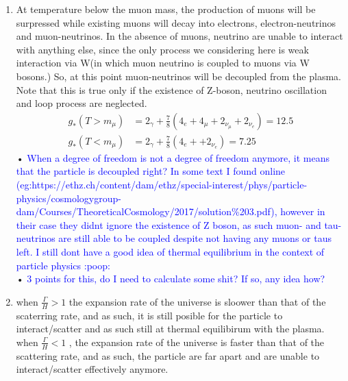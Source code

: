 \begin{enumerate}[label=\alph*)]
\item At temperature below the muon mass, the production of muons will be surpressed while existing muons will decay into electrons, electron-neutrinos and muon-neutrinos. In the absence of muons, neutrino are unable to interact with anything else, since the only process we considering here is weak interaction via W(in which muon neutrino is coupled to muons via W bosons.) So, at this point  muon-neutrinos will be decoupled from the plasma. Note that this is true only if the existence of Z-boson, neutrino oscillation and loop process are neglected.
\begin{align}
g_{\ast} (T>m_{\mu}) &= 2_{\gamma} + \frac{7}{8} (4_e + 4_{\mu} +  2_{\nu_{\mu}} + 2_{\nu_{e}}) =  12.5 \\
g_{\ast} (T<m_{\mu}) &= 2_{\gamma} + \frac{7}{8} (4_e +  + 2_{\nu_{e}}) =  7.25 
\end{align}•
\textcolor{blue}{When a degree of freedom is not a degree of freedom anymore, it means that the particle is decoupled right? In some text I found online (eg:https://ethz.ch/content/dam/ethz/special-interest/phys/particle-physics/cosmologygroup-dam/Courses/TheoreticalCosmology/2017/solution\%203.pdf), however in their case they didnt ignore the existence of Z boson, as such muon- and tau-neutrinos are still able to be coupled despite not having any muons or taus left. }
\textcolor{blue}{I still dont have a good idea of thermal equilibrium in the context of particle physics :poop:\\}•
\textcolor{blue}{3 points for this, do I need to calculate some shit? If so, any idea how?}

\item when $\frac{\Gamma}{H} > 1$ the expansion rate of the universe is sloower than that of the scaterring rate, and as such, it is still posible for the particle to interact/scatter and as such still at thermal equilibirum with the plasma. \\

when $\frac{\Gamma}{H} < 1$ , the expansion rate of the universe is faster than that of the scattering rate, and as such, the particle are far apart and are unable to interact/scatter effectively anymore. \\


\end{enumerate}
